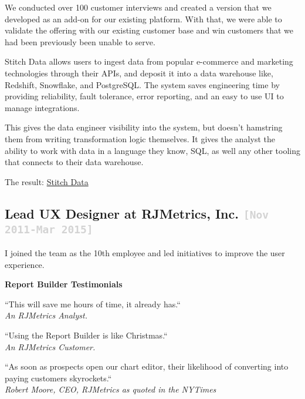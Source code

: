 \documentclass{tufte-handout}
\newcommand{\shstandout}[1]{\textbf{\textcolor{BurntOrange}{#1}}}
\newcommand{\shyears}[1]{\small{\texttt{\textcolor{LightGray}{#1}}}}
\begin{document}
We conducted over 100 customer interviews and created a version that we developed as an add-on for our existing platform. With that, we were able to validate the offering with our existing customer base and win customers that we had been previously been unable to serve.

Stitch Data allows users to ingest data from popular e-commerce and marketing technologies through their APIs, and deposit it into a data warehouse like, Redshift, Snowflake, and PostgreSQL. The system saves engineering time by providing reliability, fault tolerance, error reporting, and an easy to use UI to manage integrations.

This gives the data engineer visibility into the system, but doesn't hamstring them from writing transformation logic themselves. It gives the analyst the ability to work with data in a language they know, SQL, as well any other tooling that connects to their data warehouse.

The result: \href{https://www.stitchdata.com/}{Stitch Data}

\pagebreak

\subsection{\textbf{Lead UX Designer} at \shstandout{RJMetrics, Inc.} \shyears{[Nov 2011-Mar 2015]}}

I joined the team as the 10th employee and led initiatives to improve the user experience.

\begin{marginfigure}%
\textbf{Report Builder Testimonials}

\end{marginfigure}%

\begin{marginfigure}%
``This will save me hours of time, it already has.``
\\
\textit{An RJMetrics Analyst.}
\end{marginfigure}%

\begin{marginfigure}%
``Using the Report Builder is like Christmas.``
\\
\textit{An RJMetrics Customer.}
\end{marginfigure}%

\begin{marginfigure}%
``As soon as prospects open our chart editor, their likelihood of converting into paying customers skyrockets.``
\\
\textit{Robert Moore, CEO, RJMetrics as quoted in the NYTimes}

\end{marginfigure}%
\end{document}
